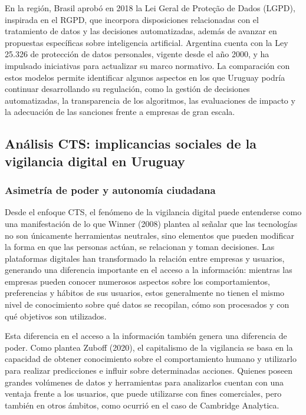 \documentclass[11pt,a4paper]{article}
\begin{document}
En la región, Brasil aprobó en 2018 la Lei Geral de Proteção de Dados (LGPD), inspirada en el RGPD, que incorpora disposiciones relacionadas con el tratamiento de datos y las decisiones automatizadas, además de avanzar en propuestas específicas sobre inteligencia artificial. Argentina cuenta con la Ley 25.326 de protección de datos personales, vigente desde el año 2000, y ha impulsado iniciativas para actualizar su marco normativo. La comparación con estos modelos permite identificar algunos aspectos en los que Uruguay podría continuar desarrollando su regulación, como la gestión de decisiones automatizadas, la transparencia de los algoritmos, las evaluaciones de impacto y la adecuación de las sanciones frente a empresas de gran escala.

\subsection{Análisis CTS: implicancias sociales de la vigilancia digital en Uruguay}

\subsubsection{Asimetría de poder y autonomía ciudadana}

Desde el enfoque CTS, el fenómeno de la vigilancia digital puede entenderse como una manifestación de lo que Winner (2008) plantea al señalar que las tecnologías no son únicamente herramientas neutrales, sino elementos que pueden modificar la forma en que las personas actúan, se relacionan y toman decisiones. Las plataformas digitales han transformado la relación entre empresas y usuarios, generando una diferencia importante en el acceso a la información: mientras las empresas pueden conocer numerosos aspectos sobre los comportamientos, preferencias y hábitos de sus usuarios, estos generalmente no tienen el mismo nivel de conocimiento sobre qué datos se recopilan, cómo son procesados y con qué objetivos son utilizados.

Esta diferencia en el acceso a la información también genera una diferencia de poder. Como plantea Zuboff (2020), el capitalismo de la vigilancia se basa en la capacidad de obtener conocimiento sobre el comportamiento humano y utilizarlo para realizar predicciones e influir sobre determinadas acciones. Quienes poseen grandes volúmenes de datos y herramientas para analizarlos cuentan con una ventaja frente a los usuarios, que puede utilizarse con fines comerciales, pero también en otros ámbitos, como ocurrió en el caso de Cambridge Analytica.
\end{document}
